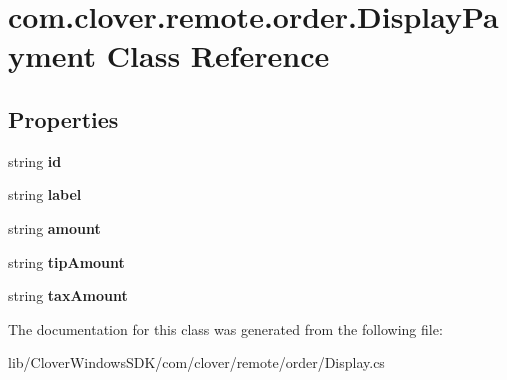 \hypertarget{classcom_1_1clover_1_1remote_1_1order_1_1_display_payment}{}\section{com.\+clover.\+remote.\+order.\+Display\+Payment Class Reference}
\label{classcom_1_1clover_1_1remote_1_1order_1_1_display_payment}
\subsection*{Properties}
\begin{DoxyCompactItemize}
\item 
\mbox{\label{classcom_1_1clover_1_1remote_1_1order_1_1_display_payment_a3291b3788d64296db72223e5af2b0c32}} 
string {\bfseries id}
\item 
\mbox{\label{classcom_1_1clover_1_1remote_1_1order_1_1_display_payment_af414138504b940f672907285873f98e3}} 
string {\bfseries label}
\item 
\mbox{\label{classcom_1_1clover_1_1remote_1_1order_1_1_display_payment_a4933675d71aed714ec7ac90624a2c99c}} 
string {\bfseries amount}
\item 
\mbox{\label{classcom_1_1clover_1_1remote_1_1order_1_1_display_payment_afa9552c29076962d4e9f74f9395f4b4b}} 
string {\bfseries tip\+Amount}
\item 
\mbox{\label{classcom_1_1clover_1_1remote_1_1order_1_1_display_payment_ab15e9b7d1c6adeb4002fe9bae2f10db4}} 
string {\bfseries tax\+Amount}
\end{DoxyCompactItemize}


The documentation for this class was generated from the following file\+:\begin{DoxyCompactItemize}
\item 
lib/\+Clover\+Windows\+S\+D\+K/com/clover/remote/order/Display.\+cs\end{DoxyCompactItemize}
